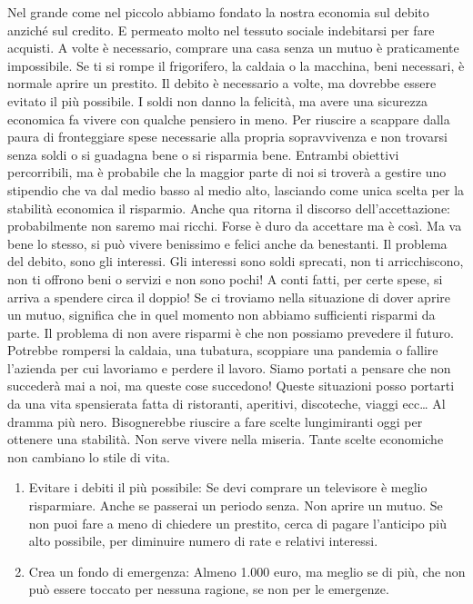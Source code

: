 \documentclass[12pt]{book} %
\begin{document}
Nel grande come nel piccolo abbiamo fondato la nostra economia sul debito anziché sul credito. E permeato molto nel
tessuto sociale indebitarsi per fare acquisti. A volte è necessario, comprare una casa senza un mutuo è praticamente
impossibile. Se ti si rompe il frigorifero, la caldaia o la macchina, beni necessari, è normale aprire un prestito. Il
debito è necessario a volte, ma dovrebbe essere evitato il più possibile. I soldi non danno la felicità, ma avere una
sicurezza economica fa vivere con qualche pensiero in meno. Per riuscire a scappare dalla paura di fronteggiare spese
necessarie alla propria sopravvivenza e non trovarsi senza soldi o si guadagna bene o si risparmia bene. Entrambi
obiettivi percorribili, ma è probabile che la maggior parte di noi si troverà a gestire uno stipendio che va dal medio
basso al medio alto, lasciando come unica scelta per la stabilità economica il risparmio. Anche qua ritorna il discorso
dell'accettazione: probabilmente non saremo mai ricchi. Forse è duro da accettare ma è così. Ma va
bene lo stesso, si può vivere benissimo e felici anche da benestanti. Il problema del debito, sono gli interessi. Gli
interessi sono soldi sprecati, non ti arricchiscono, non ti offrono beni o servizi e non sono pochi! A conti fatti, per
certe spese, si arriva a spendere circa il doppio! Se ci troviamo nella situazione di dover aprire un mutuo, significa
che in quel momento non abbiamo sufficienti risparmi da parte. Il problema di non avere risparmi è che non possiamo
prevedere il futuro. Potrebbe rompersi la caldaia, una tubatura, scoppiare una pandemia o fallire
l'azienda per cui lavoriamo e perdere il lavoro. Siamo portati a pensare che non succederà mai a
noi, ma queste cose succedono! Queste situazioni posso portarti da una vita spensierata fatta di ristoranti, aperitivi,
discoteche, viaggi ecc… Al dramma più nero. Bisognerebbe riuscire a fare scelte lungimiranti oggi per ottenere una
stabilità. Non serve vivere nella miseria. Tante scelte economiche non cambiano lo stile di vita.

\begin{enumerate}
\item Evitare i debiti il più possibile: Se devi comprare un televisore è meglio risparmiare. Anche se passerai un
periodo senza. Non aprire un mutuo. Se non puoi fare a meno di chiedere un prestito, cerca di pagare l'anticipo più
alto possibile, per diminuire numero di rate e relativi interessi.
\item Crea un fondo di emergenza: Almeno 1.000 euro, ma meglio se di più, che non può essere toccato per nessuna
ragione, se non per le emergenze.
\end{enumerate}
\end{document}
